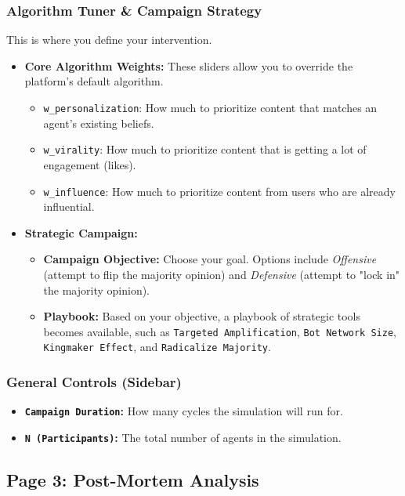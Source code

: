 \documentclass[11pt, a4paper]{article}
\begin{document}
\subsubsection{Algorithm Tuner \& Campaign Strategy}
This is where you define your intervention.
\begin{itemize}
    \item \textbf{Core Algorithm Weights:} These sliders allow you to override the platform's default algorithm.
    \begin{itemize}
        \item \texttt{w\_personalization}: How much to prioritize content that matches an agent's existing beliefs.
        \item \texttt{w\_virality}: How much to prioritize content that is getting a lot of engagement (likes).
        \item \texttt{w\_influence}: How much to prioritize content from users who are already influential.
    \end{itemize}
    \item \textbf{Strategic Campaign:}
    \begin{itemize}
        \item \textbf{Campaign Objective:} Choose your goal. Options include \textit{Offensive} (attempt to flip the majority opinion) and \textit{Defensive} (attempt to "lock in" the majority opinion).
        \item \textbf{Playbook:} Based on your objective, a playbook of strategic tools becomes available, such as \texttt{Targeted Amplification}, \texttt{Bot Network Size}, \texttt{Kingmaker Effect}, and \texttt{Radicalize Majority}.
    \end{itemize}
\end{itemize}

\subsubsection{General Controls (Sidebar)}
\begin{itemize}
    \item \textbf{\texttt{Campaign Duration}:} How many cycles the simulation will run for.
    \item \textbf{\texttt{N (Participants)}:} The total number of agents in the simulation.
\end{itemize}

\subsection{Page 3: Post-Mortem Analysis}
\end{document}
